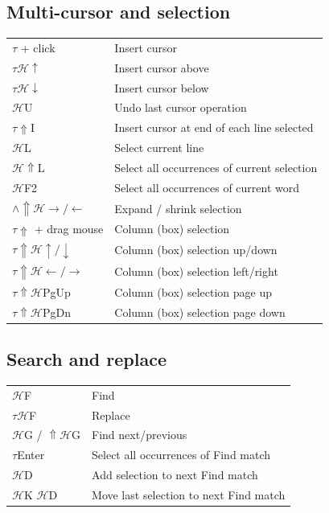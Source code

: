 \documentclass[UTF8]{article}
\begin{document}
\subsection*{Multi-cursor and selection}
\begin{tabular}{ll}
$\tau$ + click & Insert cursor \\
$\tau\mathscr{H}\uparrow$ & Insert cursor above \\
$\tau\mathscr{H}\downarrow$ & Insert cursor below \\
$\mathscr{H}$U & Undo last cursor operation \\
$\tau\Uparrow$I & Insert cursor at end of each line selected \\
$\mathscr{H}$L & Select current line \\
$\mathscr{H}\Uparrow$L & Select all occurrences of current selection \\
$\mathscr{H}$F2 & Select all occurrences of current word \\
$\wedge\Uparrow\mathscr{H}\rightarrow / \leftarrow$ & Expand / shrink selection \\
$\tau\Uparrow$ + drag mouse & Column (box) selection \\
$\tau\Uparrow\mathscr{H}\uparrow / \downarrow$ & Column (box) selection up/down \\
$\tau\Uparrow\mathscr{H}\leftarrow / \rightarrow$ & Column (box) selection left/right \\
$\tau\Uparrow\mathscr{H}$PgUp & Column (box) selection page up \\
$\tau\Uparrow\mathscr{H}$PgDn & Column (box) selection page down
\end{tabular}

\subsection*{Search and replace}
\begin{tabular}{ll}
$\mathscr{H}$F & Find \\
$\tau\mathscr{H}$F & Replace \\
$\mathscr{H}$G / $\Uparrow\mathscr{H}$G & Find next/previous \\
$\tau$Enter & Select all occurrences of Find match \\
$\mathscr{H}$D & Add selection to next Find match \\
$\mathscr{H}$K $\mathscr{H}$D & Move last selection to next Find match
\end{tabular}
\end{document}
